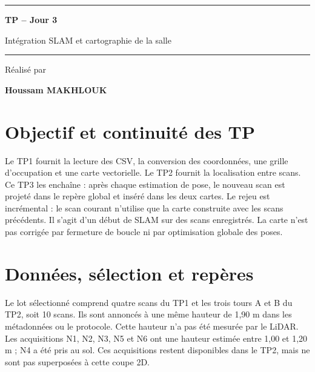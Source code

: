 \documentclass[11pt,a4paper]{article}
\begin{document}
\hypersetup{pageanchor=false}
\begin{titlepage}\centering
\vspace*{1cm}{\Large\bfseries EIGSI\par}
\vspace{.4cm}{\large Année universitaire 2026/2027\par}
\vspace{2cm}{\large RAPPORT DE TRAVAUX PRATIQUES\par}
\vspace{.8cm}\rule{.9\textwidth}{1pt}\par\vspace{.6cm}
{\Huge\bfseries TP -- Jour 3\par}\vspace{.6cm}
{\LARGE Intégration SLAM et cartographie de la salle\par}
\vspace{.6cm}\rule{.9\textwidth}{1pt}
\vfill{\large Réalisé par\par}\vspace{.3cm}
{\LARGE\bfseries Houssam MAKHLOUK\par}
\vspace{.4cm}{\large Étudiant à EIGSI\par}
\vfill
\end{titlepage}
\hypersetup{pageanchor=true}
\tableofcontents\clearpage{}

\section{Objectif et continuité des TP}
Le TP1 fournit la lecture des CSV, la conversion des coordonnées, une grille
d'occupation et une carte vectorielle. Le TP2 fournit la localisation entre
scans. Ce TP3 les enchaîne : après chaque estimation de pose, le nouveau scan
est projeté dans le repère global et inséré dans les deux cartes. Le rejeu
est incrémental : le scan courant n'utilise que la carte construite avec les
scans précédents. Il s'agit d'un début de SLAM sur des scans enregistrés. La carte n'est pas corrigée par
fermeture de boucle ni par optimisation globale des poses.

\section{Données, sélection et repères}
Le lot sélectionné comprend quatre scans du TP1 et les trois tours A et B du
TP2, soit 10 scans. Ils sont annoncés à une même hauteur de 1,90 m dans
les métadonnées ou le protocole. Cette hauteur n'a pas été mesurée par le
LiDAR. Les acquisitions N1, N2, N3, N5 et N6 ont une hauteur estimée entre
1,00 et 1,20 m ; N4 a été pris au sol. Ces acquisitions restent disponibles
dans le TP2, mais ne sont pas superposées à cette coupe 2D.
\end{document}
